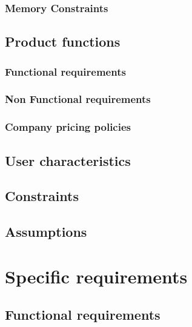 \documentclass[a4paper,oneside,11pt]{article}
\begin{document}
            \subsubsection{Memory Constraints}
                
        
        
        
        \subsection{Product functions}
            
            \subsubsection{Functional requirements}
            
            \subsubsection{Non Functional requirements}
            
            \subsubsection{Company pricing policies}
            
        \subsection{User characteristics}
            
        \subsection{Constraints}
            
        \subsection{Assumptions}
            
        
    \newpage
    \section{Specific requirements}
    
        \subsection{Functional requirements}
            
\end{document}

